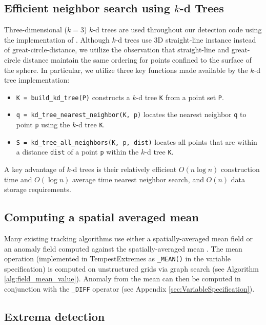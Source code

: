 \documentclass[gmdd, hvmath, online]{copernicus_discussions}
\begin{document}
\subsection{Efficient neighbor search using $k$-d Trees}

Three-dimensional ($k=3$) $k$-d trees \citep{bentley1975multidimensional} are used throughout our detection code using the implementation of \cite{tsiombikas2015kdtree}.  Although $k$-d trees use 3D straight-line instance instead of great-circle-distance, we utilize the observation that straight-line and great-circle distance maintain the same ordering for points confined to the surface of the sphere.  In particular, we utilize three key functions made available by the $k$-d tree implementation:
\begin{itemize}
\item[] \texttt{K = build\_kd\_tree(P)} constructs a $k$-d tree \texttt{K} from a point set \texttt{P}.
\item[] \texttt{q = kd\_tree\_nearest\_neighbor(K, p)} locates the nearest neighbor \texttt{q} to point \texttt{p} using the $k$-d tree \texttt{K}.
\item[] \texttt{S = kd\_tree\_all\_neighbors(K, p, dist)} locates all points that are within a distance \texttt{dist} of a point \texttt{p} within the $k$-d tree \texttt{K}.
\end{itemize}

\noindent A key advantage of $k$-d trees is their relatively efficient $O(n \log n)$ construction time and $O(\log n)$ average time nearest neighbor search, and $O(n)$ data storage requirements.

\subsection{Computing a spatial averaged mean}

Many existing tracking algorithms use either a spatially-averaged mean field or an anomaly field computed against the spatially-averaged mean \citep{haarsma1993tropical,bengtsson1995hurricane}.  The mean operation (implemented in TempestExtremes as \texttt{\_MEAN()} in the variable specification) is computed on unstructured grids via graph search (see Algorithm \ref{alg:field_mean_value}).  Anomaly from the mean can then be computed in conjunction with the \texttt{\_DIFF} operator (see Appendix \ref{sec:VariableSpecification}).

\subsection{Extrema detection}
\end{document}
